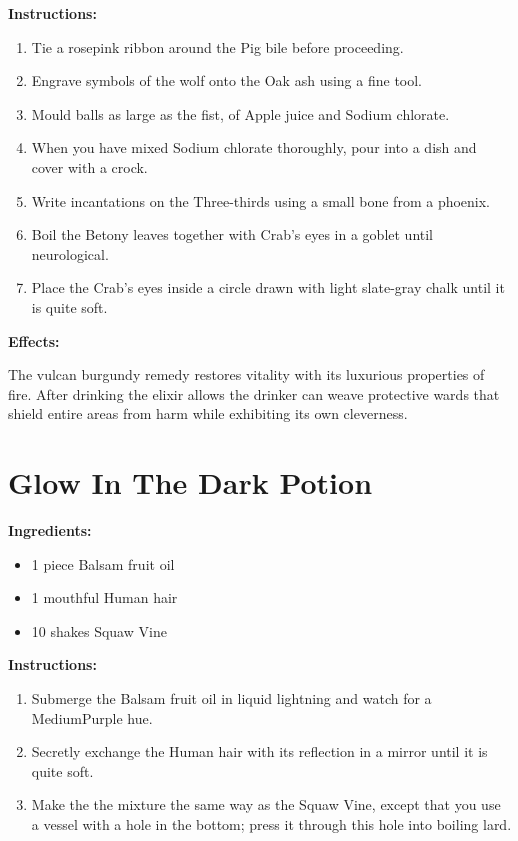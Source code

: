 \documentclass{article}
\begin{document}
\textbf{Instructions:}

\begin{enumerate}
  \item Tie a rosepink ribbon around the Pig bile before proceeding.
  \item Engrave symbols of the wolf onto the Oak ash using a fine tool.
  \item Mould balls as large as the fist, of Apple juice and Sodium chlorate.
  \item When you have mixed Sodium chlorate thoroughly, pour into a dish and cover with a crock.
  \item Write incantations on the Three-thirds using a small bone from a phoenix.
  \item Boil the Betony leaves together with Crab's eyes in a goblet until neurological.
  \item Place the Crab's eyes inside a circle drawn with light slate-gray chalk until it is quite soft.
\end{enumerate}

\textbf{Effects:}

The vulcan burgundy remedy restores vitality with its luxurious properties of fire. After drinking the elixir allows the drinker can weave protective wards that shield entire areas from harm while exhibiting its own cleverness.

\newpage
\section*{Glow In The Dark Potion}

\textbf{Ingredients:}

\begin{itemize}
  \item 1 piece Balsam fruit oil
  \item 1 mouthful Human hair
  \item 10 shakes Squaw Vine
\end{itemize}

\textbf{Instructions:}

\begin{enumerate}
  \item Submerge the Balsam fruit oil in liquid lightning and watch for a MediumPurple hue.
  \item Secretly exchange the Human hair with its reflection in a mirror until it is quite soft.
  \item Make the the mixture the same way as the Squaw Vine, except that you use a vessel with a hole in the bottom; press it through this hole into boiling lard.
\end{enumerate}
\end{document}
